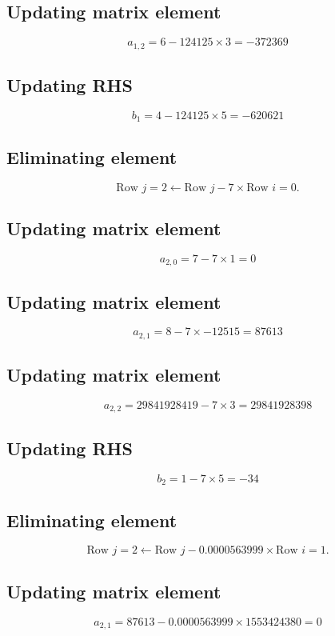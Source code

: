 \documentclass{article}
\begin{document}
\subsection*{ \vspace{1em} Updating matrix element}
\[
a_{1,2} = 6 - 124125 \times 3 = -372369
\]
\subsection*{ \vspace{1em} Updating RHS}
\[
b_{1} = 4 - 124125 \times 5 = -620621
\]
\subsection*{ \vspace{1em} Eliminating element}
\[
\text{Row } j = 2 \leftarrow \text{Row } j - 7 \times \text{Row } i = 0.
\]
\subsection*{ \vspace{1em} Updating matrix element}
\[
a_{2,0} = 7 - 7 \times 1 = 0
\]
\subsection*{ \vspace{1em} Updating matrix element}
\[
a_{2,1} = 8 - 7 \times -12515 = 87613
\]
\subsection*{ \vspace{1em} Updating matrix element}
\[
a_{2,2} = 29841928419 - 7 \times 3 = 29841928398
\]
\subsection*{ \vspace{1em} Updating RHS}
\[
b_{2} = 1 - 7 \times 5 = -34
\]
\subsection*{ \vspace{1em} Eliminating element}
\[
\text{Row } j = 2 \leftarrow \text{Row } j - 0.0000563999 \times \text{Row } i = 1.
\]
\subsection*{ \vspace{1em} Updating matrix element}
\[
a_{2,1} = 87613 - 0.0000563999 \times 1553424380 = 0
\]
\end{document}
